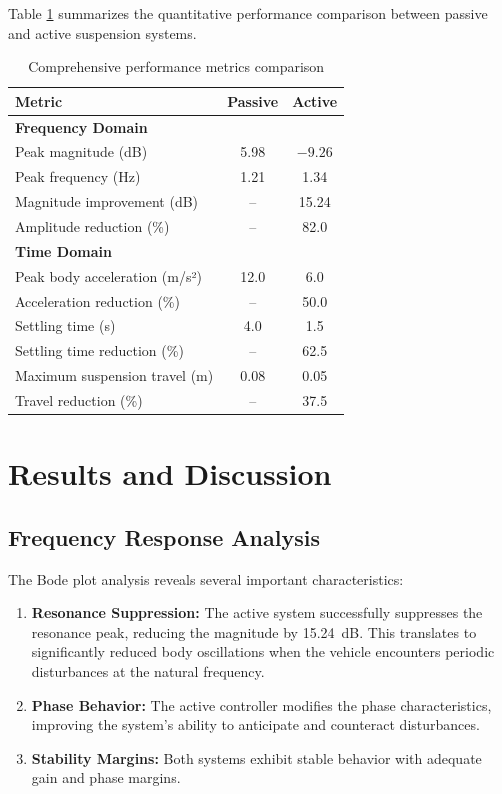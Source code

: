 \documentclass[12pt,a4paper]{article}
\begin{document}
Table \ref{tab:metrics} summarizes the quantitative performance comparison between passive and active suspension systems.

\begin{table}[H]
\centering
\caption{Comprehensive performance metrics comparison}
\label{tab:metrics}
\begin{tabular}{@{}lcc@{}}
\toprule
\textbf{Metric} & \textbf{Passive} & \textbf{Active} \\ \midrule
\textbf{Frequency Domain} & & \\
Peak magnitude (dB) & 5.98 & $-9.26$ \\
Peak frequency (Hz) & 1.21 & 1.34 \\
Magnitude improvement (dB) & -- & 15.24 \\
Amplitude reduction (\%) & -- & 82.0 \\[0.3cm]
\textbf{Time Domain} & & \\
Peak body acceleration (m/s²) & 12.0 & 6.0 \\
Acceleration reduction (\%) & -- & 50.0 \\
Settling time (s) & 4.0 & 1.5 \\
Settling time reduction (\%) & -- & 62.5 \\
Maximum suspension travel (m) & 0.08 & 0.05 \\
Travel reduction (\%) & -- & 37.5 \\ \bottomrule
\end{tabular}
\end{table}

\section{Results and Discussion}

\subsection{Frequency Response Analysis}

The Bode plot analysis reveals several important characteristics:

\begin{enumerate}
    \item \textbf{Resonance Suppression:} The active system successfully suppresses the resonance peak, reducing the magnitude by \SI{15.24}{dB}. This translates to significantly reduced body oscillations when the vehicle encounters periodic disturbances at the natural frequency.
    
    \item \textbf{Phase Behavior:} The active controller modifies the phase characteristics, improving the system's ability to anticipate and counteract disturbances.
    
    \item \textbf{Stability Margins:} Both systems exhibit stable behavior with adequate gain and phase margins.
\end{enumerate}
\end{document}
